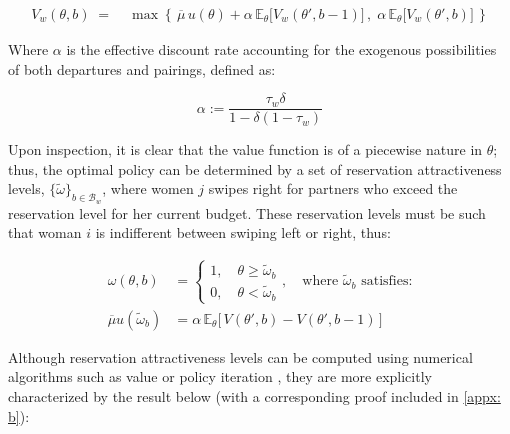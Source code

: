 \begin{equation}
    \begin{aligned} 
        V_w(\theta,b) \;=\;&\max\left\{\,\overline{\mu} \, u(\theta) +\alpha \,\mathbb{E}_\theta \Big[V_w(\theta', b-1)\Big]\,,\; \alpha\,\mathbb{E}_\theta \Big[ V_w(\theta', b)\Big]\,\right\}
    \end{aligned}
\end{equation}

Where $\alpha$ is the effective discount rate accounting for the exogenous possibilities of both departures and pairings, defined as: 

\begin{equation*}
\alpha:=\frac{\tau_w\delta}{1-\delta(1-\tau_w)}
\end{equation*}

Upon inspection, it is clear that the value function is of a piecewise nature in $\theta$; thus, the optimal policy can be determined by a set of reservation attractiveness levels, $\{\tilde\omega\}_{b\in \mathcal{B}_w}$, where women $j$ swipes right for partners who exceed the reservation level for her current budget. These reservation levels must be such that woman $i$ is indifferent between swiping left or right, thus:

\begin{equation*}
    \begin{split}
        \omega(\theta,b)&=\begin{cases}
            1,\quad \theta\geq \widetilde{\omega}_b \\ 
            0, \quad\theta< \widetilde\omega _b  
        \end{cases} , \quad \text{where $\widetilde{\omega}_b$ satisfies:} \\[8pt] 
        \overline\mu u(\widetilde\omega_b) &= \alpha \, \mathbb{E}_\theta\Big[\,V(\theta',b)-V(\theta',b-1)\,\Big]  
    \end{split}
\end{equation*} 

Although reservation attractiveness levels can be computed using numerical algorithms such as value or policy iteration \citep{rust1987optimal}, they are more explicitly characterized by the result below (with a corresponding proof included in \autoref{appx: b}): 

